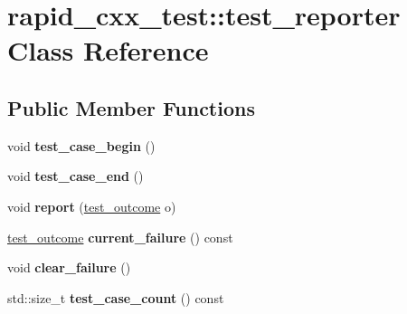 \hypertarget{classrapid__cxx__test_1_1test__reporter}{}\section{rapid\+\_\+cxx\+\_\+test\+:\+:test\+\_\+reporter Class Reference}
\label{classrapid__cxx__test_1_1test__reporter}
\subsection*{Public Member Functions}
\begin{DoxyCompactItemize}
\item 
\mbox{\label{classrapid__cxx__test_1_1test__reporter_a0020a481a7c3a8531d1ec323cd97631a}} 
void {\bfseries test\+\_\+case\+\_\+begin} ()
\item 
\mbox{\label{classrapid__cxx__test_1_1test__reporter_ae8ff36b35f142996c197617eb74a1244}} 
void {\bfseries test\+\_\+case\+\_\+end} ()
\item 
\mbox{\label{classrapid__cxx__test_1_1test__reporter_aac716edc2d63f643f6f277bfe86e5c28}} 
void {\bfseries report} (\mbox{\hyperlink{structrapid__cxx__test_1_1test__outcome}{test\+\_\+outcome}} o)
\item 
\mbox{\label{classrapid__cxx__test_1_1test__reporter_acfc9bf28f765f690d73e3b19c9a29028}} 
\mbox{\hyperlink{structrapid__cxx__test_1_1test__outcome}{test\+\_\+outcome}} {\bfseries current\+\_\+failure} () const
\item 
\mbox{\label{classrapid__cxx__test_1_1test__reporter_a9f0ede654e7b0de861ca03768503b90d}} 
void {\bfseries clear\+\_\+failure} ()
\item 
\mbox{\label{classrapid__cxx__test_1_1test__reporter_a054043ced1b0c52b5ce80f229b8dbead}} 
std\+::size\+\_\+t {\bfseries test\+\_\+case\+\_\+count} () const
\item 
\mbox{\label{classrapid__cxx__test_1_1test__reporter_af5f95b1f4f793077b98e4f6e26af1559}} 

\end{DoxyCompactItemize}
